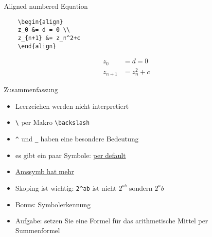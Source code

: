 \begin{frame}[fragile]{Aligned numbered Equation}
    \begin{lstlisting}
    \begin{align}
    z_0 &= d = 0 \\
    z_{n+1} &= z_n^2+c
    \end{align}
    \end{lstlisting}
    \begin{align}
    z_0 &= d = 0 \\
    z_{n+1} &= z_n^2+c
    \end{align}
\end{frame}



\begin{frame}[fragile]{Zusammenfassung}
    \begin{itemize}[<+->]
        \item Leerzeichen werden nicht interpretiert
        \item \texttt{\textbackslash} per Makro \lstinline|\backslash|
        \item \lstinline|^| und \lstinline|_| haben eine besondere Bedeutung
        \item es gibt ein paar Symbole: \href{https://en.wikibooks.org/wiki/LaTeX/Mathematics#List_of_Mathematical_Symbols}{per default}
        \item \href{http://milde.users.sourceforge.net/LUCR/Math/mathpackages/amssymb-symbols.pdf}{Amssymb hat mehr}
        \item Skoping ist wichtig: \lstinline|2^ab| ist nicht $ 2^{ab} $ sondern $ 2^ab$
        \item Bonus: \href{http://detexify.kirelabs.org/classify.html}{Symbolerkennung}
        \item Aufgabe: setzen Sie eine Formel für das arithmetische Mittel per Summenformel
    \end{itemize}
\end{frame}

